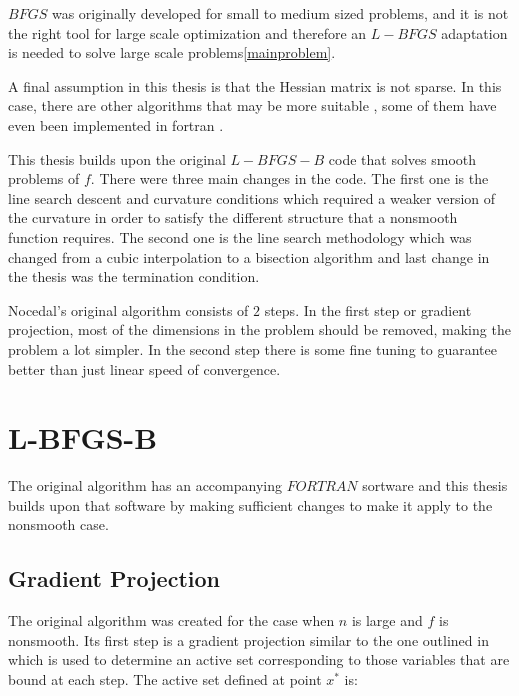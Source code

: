 $BFGS$ was originally developed for small to medium sized problems, and it is not the right tool for large scale optimization and therefore an $L-BFGS$ adaptation is needed to solve large scale problems\ref{mainproblem}. 

A final assumption in this thesis is that the Hessian matrix is not sparse. In this case, there are other algorithms that may be more suitable \citep{Fletcher96computingsparse, sparse}, some of them have even been implemented in fortran \citep{lancelot}.

This thesis builds upon the original $L-BFGS-B$ code \citep{lbfgsbsoftware} that solves smooth problems of $f$. There were three main changes in the code. The first one is the line search descent and curvature conditions which required a weaker version of the curvature in order to satisfy the different structure that a nonsmooth function requires. The second one is the line search methodology which was changed from a cubic interpolation to a bisection algorithm and last change in the thesis was the termination condition.

Nocedal's original algorithm consists of $2$ steps. In the first step or gradient projection, most of the dimensions in the problem should be removed, making the problem a lot simpler. In the second step there is some fine tuning to guarantee better than just linear speed of convergence.

\chapter{L-BFGS-B}
\label{ChapterConstraints} %

The original algorithm \citep{mainpaper} has an accompanying $FORTRAN$ sortware \citep{lbfgsbsoftware} and this thesis builds upon that software by making sufficient changes to make it apply to the nonsmooth case.

\section{Gradient Projection}

The original algorithm was created for the case when $n$ is large and $f$ is nonsmooth. Its first step is a gradient projection similar to the one outlined in \citep{gradproj1, gradproj2} which is used to determine an active set corresponding to those variables that are bound at each step. The active set defined at point $x^*$ is:

